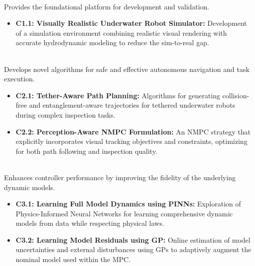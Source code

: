 \begin{description}[leftmargin=1cm, style=unboxed, font=\normalfont] %

    \item[\textcolor{blue}{\textbf{[C1] Simulation Infrastructure}}] \hfill \\
        Provides the foundational platform for development and validation.
        \begin{itemize}[leftmargin=0.5cm, itemsep=0pt]
            \item \textbf{C1.1: Visually Realistic Underwater Robot Simulator:} Development of a simulation environment combining realistic visual rendering with accurate hydrodynamic modeling to reduce the sim-to-real gap.
        \end{itemize}

    \item[\textcolor{blue}{\textbf{[C2] Control and Planning}}] \hfill \\
        Develops novel algorithms for safe and effective autonomous navigation and task execution.
        \begin{itemize}[leftmargin=0.5cm, itemsep=0pt]
            \item \textbf{C2.1: Tether-Aware Path Planning:} Algorithms for generating collision-free and entanglement-aware trajectories for tethered underwater robots during complex inspection tasks.
            \item \textbf{C2.2: Perception-Aware NMPC Formulation:} An \ac{NMPC} strategy that explicitly incorporates visual tracking objectives and constraints, optimizing for both path following and inspection quality.
        \end{itemize}

    \item[\textcolor{blue}{\textbf{[C3] Model Learning}}] \hfill \\
        Enhances controller performance by improving the fidelity of the underlying dynamic models.
         \begin{itemize}[leftmargin=0.5cm, itemsep=0pt]
            \item \textbf{C3.1: Learning Full Model Dynamics using PINNs:} Exploration of Physics-Informed Neural Networks for learning comprehensive dynamic models from data while respecting physical laws.
            \item \textbf{C3.2: Learning Model Residuals using GP:} Online estimation of model uncertainties and external disturbances using \acp{GP} to adaptively augment the nominal model used within the \ac{MPC}.
        \end{itemize}
\end{description}

